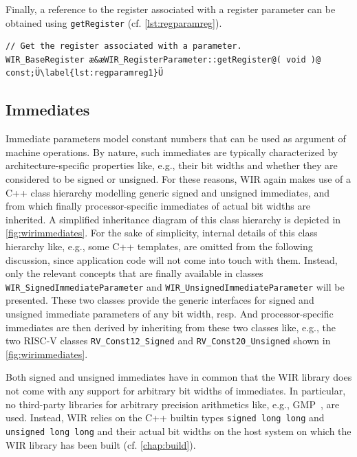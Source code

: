 Finally, a reference to the register associated with a register parameter can be obtained using \texttt{getRegister} (cf. \cref{lst:regparamreg}).

\begin{lstlisting}[style=code,float=ht,caption={Register Handling of Class \texttt{WIR\_RegisterParameter}},label=lst:regparamreg]
// Get the register associated with a parameter.
WIR_BaseRegister æ&æWIR_RegisterParameter::getRegister@( void )@ const;Ü\label{lst:regparamreg1}Ü
\end{lstlisting}


\subsection{Immediates}
\label{ssec:immparams}

Immediate parameters model constant numbers that can be used as argument of machine operations.
By nature, such immediates are typically characterized by architecture-specific properties like, e.g., their bit widths and whether they are considered to be signed or unsigned.
For these reasons, \gls{WIR} again makes use of a C++ class hierarchy modelling generic signed and unsigned immediates, and from which finally processor-specific immediates of actual bit widths are inherited.
A simplified inheritance diagram of this class hierarchy is depicted in \cref{fig:wirimmediates}.
For the sake of simplicity, internal details of this class hierarchy like, e.g., some C++ templates, are omitted from the following discussion, since application code will not come into touch with them.
Instead, only the relevant concepts that are finally available in classes \texttt{WIR\_SignedImmediateParameter} and \texttt{WIR\_UnsignedImmediateParameter} will be presented.
These two classes provide the generic interfaces for signed and unsigned immediate parameters of any bit width, resp.
And processor-specific immediates are then derived by inheriting from these two classes like, e.g., the two RISC-V classes \texttt{RV\_Const12\_Signed} and \texttt{RV\_Const20\_Unsigned} shown in \cref{fig:wirimmediates}.

Both signed and unsigned immediates have in common that the \gls{WIR} library does not come with any support for arbitrary bit widths of immediates.
In particular, no third-party libraries for arbitrary precision arithmetics like, e.g., GMP~\cite{gmp26}, are used.
Instead, \gls{WIR} relies on the C++ builtin types \texttt{signed long long} and \texttt{unsigned long long} and their actual bit widths on the host system on which the \gls{WIR} library has been built (cf. \cref{chap:build}).

